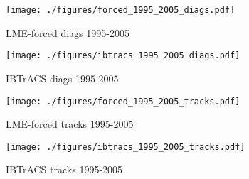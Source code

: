 \begin{figure}[!tbp]
\centering
\begin{minipage}[b]{0.45\textwidth}
\texttt{[image: ./figures/forced\_1995\_2005\_diags.pdf]}
\caption{LME-forced diags 1995-2005}
\end{minipage}
\hfill
\begin{minipage}[b]{0.45\textwidth}
\texttt{[image: ./figures/ibtracs\_1995\_2005\_diags.pdf]}
\caption{IBTrACS diags 1995-2005}
\end{minipage}
\end{figure}

\begin{figure}[!tbp]
\centering
\begin{minipage}[b]{0.45\textwidth}
\texttt{[image: ./figures/forced\_1995\_2005\_tracks.pdf]}
\caption{LME-forced tracks 1995-2005}
\end{minipage}
\hfill
\begin{minipage}[b]{0.45\textwidth}
\texttt{[image: ./figures/ibtracs\_1995\_2005\_tracks.pdf]}
\caption{IBTrACS tracks 1995-2005}
\end{minipage}
\end{figure}


